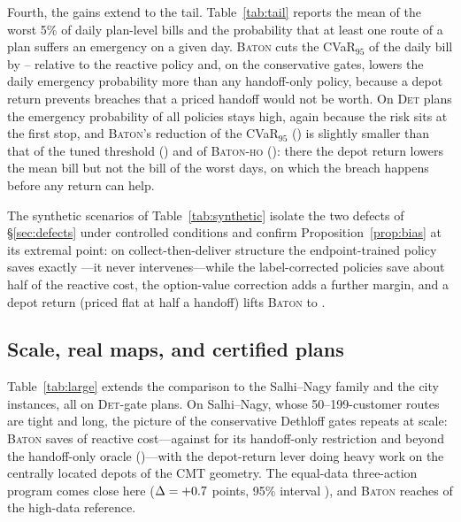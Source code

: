 \documentclass[preprint,authoryear,12pt]{elsarticle}
\theoremstyle{definition}
\theoremstyle{remark}
\begin{document}
Fourth, the gains extend to the tail. Table~\ref{tab:tail} reports the
mean of the worst 5\% of daily plan-level bills and the probability that
at least one route of a plan suffers an emergency on a given day.
\textsc{Baton} cuts the CVaR$_{95}$ of the daily bill by
\tailBatonLo--\tailBatonHi{} relative to the reactive policy and, on the
conservative gates, lowers the daily emergency probability more than
any handoff-only policy, because a depot return prevents breaches that a
priced handoff would not be worth. On \textsc{Det} plans the emergency
probability of all policies stays high, again because the risk sits at
the first stop, and \textsc{Baton}'s reduction of the CVaR$_{95}$
(\tailDetBaton) is slightly smaller than that of the tuned threshold
(\tailDetThr) and of \textsc{Baton-ho} (\tailDetHo): there the depot
return lowers the mean bill but not the bill of the worst days, on which
the breach happens before any return can help.



The synthetic scenarios of Table~\ref{tab:synthetic} isolate the two
defects of \S\ref{sec:defects} under controlled conditions and confirm
Proposition~\ref{prop:bias} at its extremal point: on
collect-then-deliver structure the endpoint-trained policy saves
exactly \ctdVOne{}---it never intervenes---while the label-corrected
policies save about half of the reactive cost, the option-value
correction adds a further margin, and a depot return (priced flat at half a handoff) lifts
\textsc{Baton} to \ctdBatonFull{}.


\subsection{Scale, real maps, and certified plans}\label{sec:large}

Table~\ref{tab:large} extends the comparison to the Salhi--Nagy family
and the city instances, all on \textsc{Det}-gate plans. On Salhi--Nagy,
whose 50--199-customer routes are tight and long, the picture of the
conservative Dethloff gates repeats at scale: \textsc{Baton} saves
\svSalhiBaton{} of reactive cost---against \svSalhiHo{} for its
handoff-only restriction and beyond the handoff-only oracle
(\svSalhiOrc{})---with the depot-return lever doing heavy work on the
centrally located depots of the CMT geometry. The equal-data
three-action program comes close here ($\Delta = +0.7$ points,
95\% interval \lgSalhiDeltaCI), and \textsc{Baton} reaches
\lgSalhiRatio{} of the high-data reference.
\end{document}
